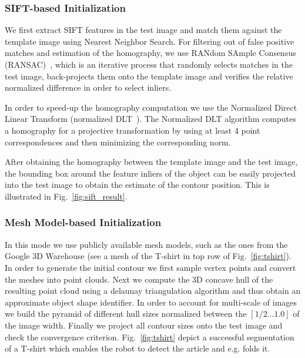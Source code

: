 \documentclass[conference]{IEEEtran}
\begin{document}
\subsubsection{SIFT-based Initialization}
\label{sec:sift}
We first extract SIFT features in the test image and match them against the template
image using Nearest Neighbor Search. For filtering out of false positive matches and estimation
of the homography, we use RANdom SAmple Consensus (RANSAC)~\cite{fischler1981random}, 
which is an iterative process that randomly selects matches in the test image, 
back-projects them onto the template image and verifies the 
relative normalized difference in order to select inliers.
  
In order to speed-up the homography computation we use the Normalized
Direct Linear Transform (normalized DLT~\cite{hartley2003multiple}). The Normalized DLT algorithm computes
a homography for a projective transformation by using at least 4 point
correspondences and then minimizing the corresponding norm.

After obtaining the homography between the template image and the
test image, the bounding box around the feature inliers of the object can be easily projected
into the test image to obtain the estimate of the contour
position. This is illustrated in Fig.~\ref{fig:sift_result}.
\subsubsection{Mesh Model-based Initialization}
\label{sec:pcl}
In this mode we use publicly available mesh models, such as the ones from the 
Google 3D Warehouse (see a mesh of the T-shirt in top row of Fig.~\ref{fig:tshirt}).
In order to generate the initial contour we first sample vertex points and convert
the meshes into point clouds. Next we compute the 3D concave hull of the resulting 
point cloud using a delaunay triangulation algorithm and thus obtain an approximate
object shape identifier. In order to account for multi-scale of images we build the 
pyramid of different hull sizes normalized between the $[1/2...1.0]$ of the image
width. Finally we project all contour sizes onto the test image and
check the convergence criterion. Fig.~\ref{fig:tshirt} depict a successful
segmentation of a T-shirt which enables the robot to detect the article
and e.g. folds it. 
\end{document}
